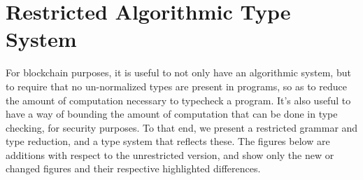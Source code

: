 \documentclass[a4paper]{article}
\begin{document}
\section{Restricted Algorithmic Type System}

For blockchain purposes, it is useful to not only have an algorithmic system, but to require that no un-normalized types are present in programs, so as to reduce the amount of computation necessary to typecheck a program. It's also useful to have a way of bounding the amount of computation that can be done in type checking, for security purposes. To that end, we present a restricted grammar and type reduction, and a type system that reflects these. The figures below are additions with respect to the unrestricted version, and show only the new or changed figures and their respective highlighted differences.








\end{document}
